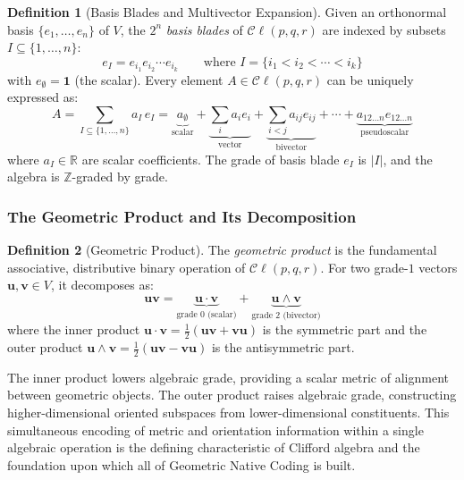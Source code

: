 \documentclass[manuscript, nonacm, review=false]{acmart}
\theoremstyle{definition}
\newtheorem{definition}{Definition}[section]
\theoremstyle{plain}
\newcommand{\R}{\mathbb{R}}
\newcommand{\Z}{\mathbb{Z}}
\newcommand{\Cl}{\mathcal{C}\!\ell}
\begin{document}
\begin{definition}[Basis Blades and Multivector Expansion]
\label{def:multivector}
Given an orthonormal basis $\{e_1, \ldots, e_n\}$ of $V$, the $2^n$ \emph{basis blades} of $\Cl(p,q,r)$ are indexed by subsets $I \subseteq \{1, \ldots, n\}$:
\begin{equation}
    e_I = e_{i_1} e_{i_2} \cdots e_{i_k} \qquad \text{where } I = \{i_1 < i_2 < \cdots < i_k\}
\end{equation}
with $e_\emptyset = \mathbf{1}$ (the scalar). Every element $A \in \Cl(p,q,r)$ can be uniquely expressed as:
\begin{equation}
    A = \sum_{I \subseteq \{1,\ldots,n\}} a_I \, e_I = \underbrace{a_\emptyset}_{\text{scalar}} + \underbrace{\sum_i a_i e_i}_{\text{vector}} + \underbrace{\sum_{i<j} a_{ij} e_{ij}}_{\text{bivector}} + \cdots + \underbrace{a_{12\ldots n} e_{12\ldots n}}_{\text{pseudoscalar}}
    \label{eq:multivector_expansion}
\end{equation}
where $a_I \in \R$ are scalar coefficients. The grade of basis blade $e_I$ is $|I|$, and the algebra is $\Z$-graded by grade.
\end{definition}


\subsubsection{The Geometric Product and Its Decomposition}

\begin{definition}[Geometric Product]
\label{def:geometric_product}
The \emph{geometric product} is the fundamental associative, distributive binary operation of $\Cl(p,q,r)$. For two grade-$1$ vectors $\mathbf{u}, \mathbf{v} \in V$, it decomposes as:
\begin{equation}
    \mathbf{u}\mathbf{v} = \underbrace{\mathbf{u} \cdot \mathbf{v}}_{\text{grade 0 (scalar)}} + \underbrace{\mathbf{u} \wedge \mathbf{v}}_{\text{grade 2 (bivector)}}
    \label{eq:geometric_product}
\end{equation}
where the inner product $\mathbf{u} \cdot \mathbf{v} = \frac{1}{2}(\mathbf{u}\mathbf{v} + \mathbf{v}\mathbf{u})$ is the symmetric part and the outer product $\mathbf{u} \wedge \mathbf{v} = \frac{1}{2}(\mathbf{u}\mathbf{v} - \mathbf{v}\mathbf{u})$ is the antisymmetric part.
\end{definition}

The inner product lowers algebraic grade, providing a scalar metric of alignment between geometric objects. The outer product raises algebraic grade, constructing higher-dimensional oriented subspaces from lower-dimensional constituents. This simultaneous encoding of metric and orientation information within a single algebraic operation is the defining characteristic of Clifford algebra and the foundation upon which all of Geometric Native Coding is built.
\end{document}
